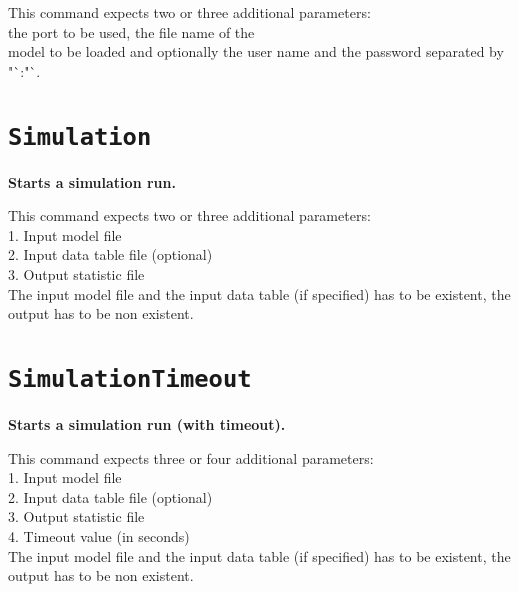 This command expects two or three additional parameters:\\
the port to be used, the file name of the\\
model to be loaded and optionally the user name and the password separated by "`:"`.

\section{\texttt{Simulation}}

\textbf{Starts a simulation run.}

This command expects two or three additional parameters:\\
1. Input model file\\
2. Input data table file (optional)\\
3. Output statistic file\\
The input model file and the input data table (if specified) has to be existent, the output has to be non existent.

\section{\texttt{SimulationTimeout}}

\textbf{Starts a simulation run (with timeout).}

This command expects three or four additional parameters:\\
1. Input model file\\
2. Input data table file (optional)\\
3. Output statistic file\\
4. Timeout value (in seconds)\\
The input model file and the input data table (if specified) has to be existent, the output has to be non existent.

